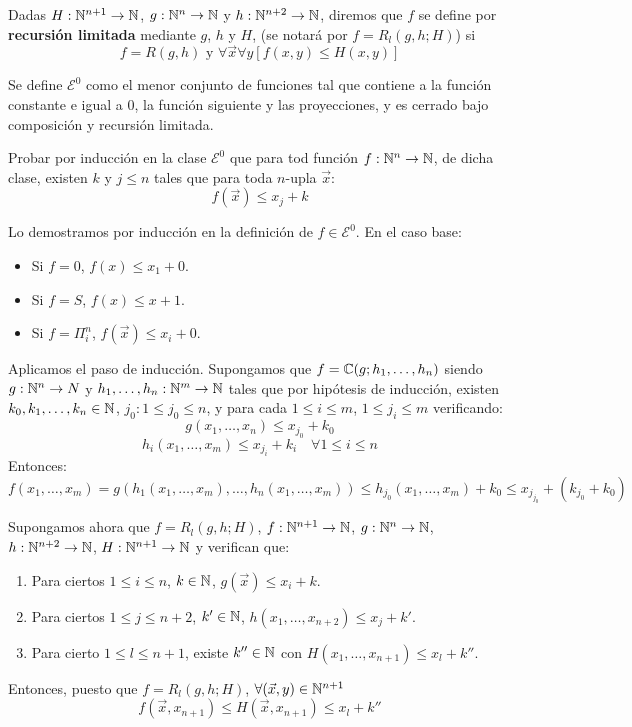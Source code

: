 \documentclass[twoside]{article}
\begin{document}
\begin{ejercicio}{30}
Dadas $H : \mathbb{N}^{n+1} \to \mathbb{N}$, $g : \mathbb{N}^n \to \mathbb{N}$ y $h : \mathbb{N}^{n+2} \to \mathbb{N}$, diremos que $f$ se define por \textbf{recursión limitada} mediante $g$, $h$ y $H$, (se notará por $f = R_l(g,h;H)$) si
\[ f = R(g,h) \text{ y } \forall \vec{x} \forall y [f(x,y) ≤ H(x,y)] \]

Se define $\mathcal{E}^0$ como el menor conjunto de funciones tal que contiene a la función constante e igual a $0$, la función siguiente y las proyecciones, y es cerrado bajo composición y recursión limitada.

Probar por inducción en la clase $\mathcal{E}^0$ que para tod función $f : \mathbb{N}^n \to \mathbb{N}$, de dicha clase, existen $k$ y $j ≤ n$ tales que para toda $n$-upla $\vec{x}$:
\[ f(\vec{x}) ≤ x_j + k \]
\end{ejercicio}
\begin{sol}
Lo demostramos por inducción en la definición de $f \in \mathcal{E}^0$. En el caso base:
\begin{itemize}
	\item Si $f = 0$, $f(x) ≤ x_1+0$.
	\item Si $f = S$, $f(x) ≤ x+1$.
	\item Si $f = Π_i^n$, $f(\vec{x}) ≤ x_i+0$.
\end{itemize}
Aplicamos el paso de inducción. Supongamos que $f = \mathbb{C}(g;h_1,\dots,h_n)$ siendo $g : \mathbb{N}^n \to N$ y $h_1,\dots,h_n : \mathbb{N}^m \to \mathbb{N}$ tales que por hipótesis de inducción, existen $k_0,k_1,\dots,k_n \in \mathbb{N}$, $j_0 : 1 ≤ j_0≤n$, y para cada $1≤i≤m$, $1≤j_i≤m$ verificando:
\[ g(x_1,\dots,x_n) ≤ x_{j_0}+k_0 \]
\[ h_i(x_1,\dots,x_m) ≤ x_{j_i} + k_i \quad \forall 1≤i≤n\]
Entonces:
\[ f(x_1,\dots,x_m) = g(h_1(x_1,\dots,x_m),\dots,h_n(x_1,\dots,x_m)) ≤ h_{j_0}(x_1,\dots,x_m) + k_0 ≤ x_{j_{j_0}} + (k_{j_0} + k_0) \]

Supongamos ahora que $f = R_l(g,h;H)$, $f : \mathbb{N}^{n+1} \to \mathbb{N}$, $g : \mathbb{N}^n \to \mathbb{N}$, $h : \mathbb{N}^{n+2} \to \mathbb{N}$, $H : \mathbb{N}^{n+1}\to\mathbb{N}$ y verifican que:
\begin{enumerate}
	\item Para ciertos $1≤i≤n$, $k \in \mathbb{N}$, $g(\vec{x})≤x_i+k$.
	\item Para ciertos $1≤j≤n+2$, $k' \in \mathbb{N}$, $h(x_1,\dots,x_{n+2})≤x_j+k'$.
	\item  Para cierto $1≤l≤n+1$, existe $k'' \in \mathbb{N}$ con $H(x_1,\dots,x_{n+1}) ≤ x_l + k''$.
\end{enumerate}
Entonces, puesto que $f = R_l(g,h;H)$, $\forall (\vec{x},y) \in \mathbb{N}^{n+1}$
\[ f(\vec{x},x_{n+1}) ≤ H(\vec{x},x_{n+1}) ≤ x_l + k'' \]
\end{sol}
\end{document}

